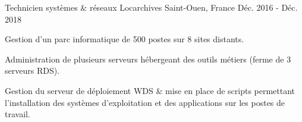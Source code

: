 \begin{cventries}
  \cventry
    {Technicien systèmes \& réseaux} %
    {Locarchives} %
    {Saint-Ouen, France} %
    {Déc. 2016 - Déc. 2018} %
    {
      \begin{cvitems} %
        \item {Gestion d'un parc informatique de 500 postes sur 8 sites distants.}
        \item {Administration de plusieurs serveurs hébergeant des outils métiers (ferme de 3 serveurs RDS).}
        \item {Gestion du serveur de déploiement WDS \& mise en place de scripts permettant l'installation des systèmes d'exploitation et des applications sur les postes de travail.}
      \end{cvitems}
    }

\end{cventries}

